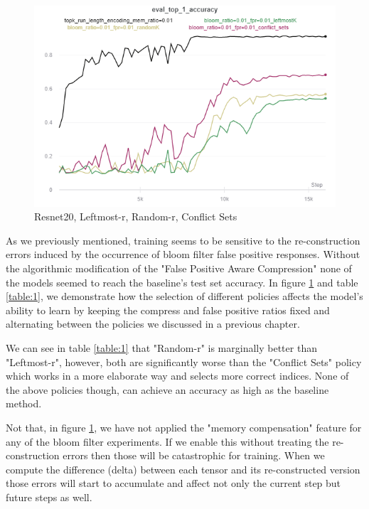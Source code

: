     \begin{figure}[h]
    \centering
    \includegraphics[width=1\textwidth]{figures/resnet20-policies.png}
    \caption{Resnet20, Leftmost-r, Random-r, Conflict Sets}
    \label{policies-comparison}
    \end{figure}
    
    \vspace{1cm}

    As we previously mentioned, training seems to be sensitive to the re-construction errors induced by the occurrence of bloom filter false positive responses.
    Without the algorithmic modification of the "False Positive Aware Compression" none of the models seemed to reach the baseline's test set accuracy.
    In figure \ref{policies-comparison} and table \ref{table:1}, we demonstrate how the selection of different policies affects the model's ability to learn by keeping the compress and false positive ratios fixed and alternating between the policies we discussed in a previous chapter.
    
    We can see in table \ref{table:1} that "Random-r" is marginally better than "Leftmost-r", however, both are significantly worse than the "Conflict Sets" policy which works in a more elaborate way and selects more correct indices. 
    None of the above policies though, can achieve an accuracy as high as the baseline method.
    
    Not that, in figure \ref{policies-comparison}, we have not applied the "memory compensation" feature for any of the bloom filter experiments.
    If we enable this without treating the re-construction errors then those will be catastrophic for training.
    When we compute the difference (delta) between each tensor and its re-constructed version those errors will start to accumulate and affect not only the current step but future steps as well.

